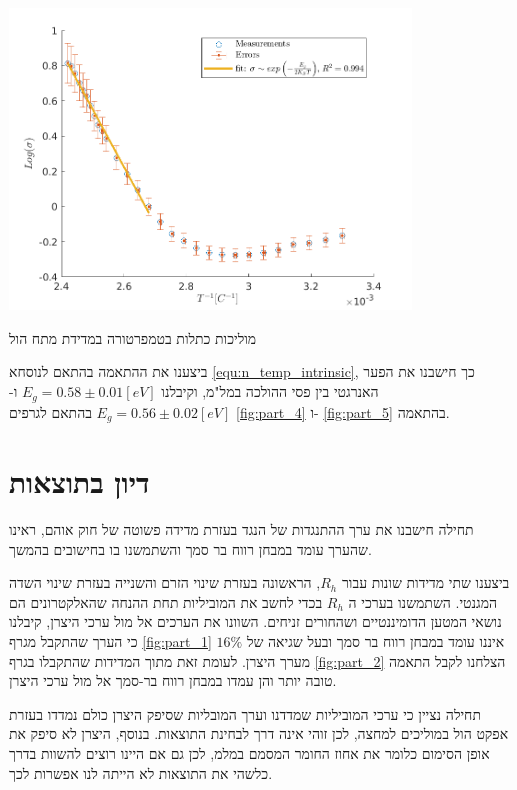 \documentclass{article}
\begin{document}

\begin{graph}[H]
    \centering
    \includegraphics[width=0.8\textwidth]{part5 - E_g with magnetic field.png}
    \caption{
    מוליכות כתלות בטמפרטורה במדידת מתח הול
    }
    \label{fig:part_5}
\end{graph}

ביצענו את ההתאמה בהתאם לנוסחא
\ref{equ:n_temp_intrinsic},
כך חישבנו את הפער האנרגטי בין פסי ההולכה במל"מ, וקיבלנו
$E_g = 0.58 \pm 0.01[eV]$
ו-
$E_g = 0.56 \pm 0.02[eV]$
בהתאם לגרפים
\ref{fig:part_4}
ו-
\ref{fig:part_5}
בהתאמה.
\section{דיון בתוצאות}
תחילה חישבנו את ערך ההתנגדות של הנגד בעזרת מדידה פשוטה של חוק אוהם, ראינו שהערך עומד במבחן רווח בר סמך והשתמשנו בו בחישובים בהמשך.


ביצענו שתי מדידות שונות עבור
$R_h$,
הראשונה בעזרת שינוי הזרם והשנייה בעזרת שינוי השדה המגנטי.
השתמשנו בערכי ה
$R_h$
בכדי לחשב את המוביליות תחת ההנחה שהאלקטרונים הם נושאי המטען הדומיננטיים ושהחורים זניחים.
השוונו את הערכים אל מול ערכי היצרן, קיבלנו כי הערך שהתקבל מגרף
\ref{fig:part_1}
איננו עומד במבחן רווח בר סמך ובעל שגיאה של 
$16\%$
מערך היצרן.
לעומת זאת מתוך המדידות שהתקבלו בגרף 
\ref{fig:part_2}
הצלחנו לקבל התאמה טובה יותר והן עמדו במבחן רווח בר-סמך אל מול ערכי היצרן.

תחילה נציין כי ערכי המוביליות שמדדנו וערך המובליות שסיפק היצרן כולם נמדדו בעזרת אפקט הול במוליכים למחצה, לכן זוהי אינה דרך לבחינת התוצאות.
בנוסף, היצרן לא סיפק את אופן הסימום כלומר את אחוז החומר המסמם במלמ,
לכן גם אם היינו רוצים להשוות בדרך כלשהי את התוצאות לא הייתה לנו אפשרות לכך.
\end{document}
